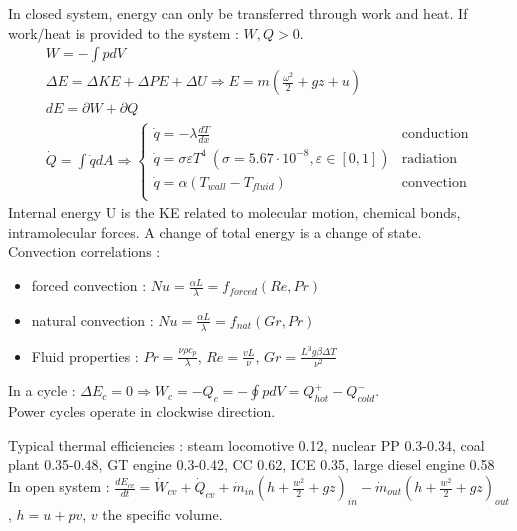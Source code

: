 \documentclass[../main.tex]{subfiles}
\begin{document}
In closed system, energy can only be transferred through work and heat. If work/heat is provided to the system : $W,Q>0$.\\
\begin{equation}
    \begin{gathered}
        W = -\int pdV\\
        \Delta E = \Delta KE + \Delta PE + \Delta U \Rightarrow E = m(\frac{\omega^2}{2} + gz+ u)\\
        dE = \partial W + \partial Q\\
        \dot{Q} = \int \dot{q}dA \Rightarrow \begin{cases}
            \dot{q} = -\lambda \frac{dT}{dx} & \text{conduction}\\
            \dot{q} = \sigma\varepsilon T^4\: (\sigma = 5.67\cdot 10^{-8}, \varepsilon\in [0,1]) & \text{radiation}\\
            \dot{q} = \alpha(T_{wall} - T_{fluid}) & \text{convection}\\
        \end{cases}
    \end{gathered}
\end{equation}
Internal energy U is the KE related to molecular motion, chemical bonds, intramolecular forces. A change of total energy is a change of state. \\
Convection correlations : \begin{itemize}
    \item forced convection : $Nu = \frac{\alpha L}{\lambda} = f_{forced}(Re,Pr)$
    \item natural convection : $Nu = \frac{\alpha L}{\lambda} = f_{nat} (Gr,Pr)$
    \item Fluid properties : $Pr = \frac{\nu \rho c_p}{\lambda}$, $Re = \frac{vL}{\nu}$, $Gr = \frac{L^3g \beta \Delta T}{\nu^2}$
\end{itemize}
In a cycle : $\Delta E_c = 0 \Rightarrow W_c = -Q_c = -\oint pdV = Q_{hot}^+ - Q_{cold}^-$.\\
\warning Power cycles operate in clockwise direction. 

Typical thermal efficiencies : steam locomotive 0.12, nuclear PP 0.3-0.34, coal plant 0.35-0.48, GT engine 0.3-0.42, CC 0.62, ICE 0.35, large diesel engine 0.58\\
In open system : $\frac{dE_{cv}}{dt} = \dot{W}_{cv} + \dot{Q}_{cv} + \dot{m}_{in}(h+ \frac{w^2}{2} + gz)_{in} - \dot{m}_{out} (h + \frac{w^2}{2} + gz)_{out}$, $h = u+pv$, $v$ the specific volume.\\
\end{document}
